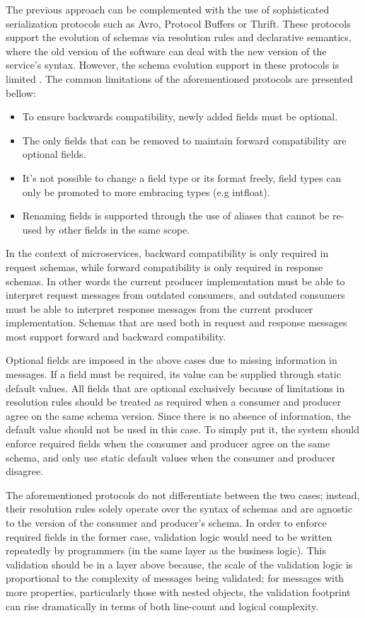 The previous approach can be complemented with the use of sophisticated serialization protocols such as Avro, Protocol Buffers or Thrift.
These protocols support the evolution of schemas via resolution rules and declarative semantics,
where the old version of the software can deal with the new version of the service’s syntax.
However, the schema evolution support in these protocols is limited \cite{11}.
The common limitations of the aforementioned protocols are presented bellow:
\begin{itemize}
    \item To ensure backwards compatibility, newly added fields must be optional.
    \item The only fields that can be removed to maintain forward compatibility are optional fields.
    \item It's not possible to change a field type or its format freely, field types can only be promoted to more embracing types (e.g int\textrightarrow float).
    \item Renaming fields is supported through the use of aliases that cannot be re-used by other fields in the same scope.
\end{itemize}

In the context of microservices, backward compatibility is only required in request schemas, while forward compatibility is only required in response schemas.
In other words the current producer implementation must be able to interpret request messages from outdated consumers, and outdated consumers
must be able to interpret response messages from the current producer implementation.
Schemas that are used both in request and response messages most support forward and backward compatibility.

Optional fields are imposed in the above cases due to missing information in messages.
If a field must be required, its value can be supplied through static default values.
All fields that are optional exclusively because of limitations in resolution rules should be treated as required when a consumer and producer agree on the same schema version.
Since there is no absence of information, the default value should not be used in this case.
To simply put it, the system should enforce required fields when the consumer and producer agree on the same schema, and only use static default values when the consumer and producer disagree.

The aforementioned protocols do not differentiate between the two cases; instead, their resolution rules solely operate over the syntax of schemas and are agnostic to the version of the consumer and producer's schema.
In order to enforce required fields in the former case,
validation logic would need to be written repeatedly by programmers (in the same layer as the business logic).
This validation should be in a layer above because, the scale of the validation logic is proportional to the complexity of messages being validated;
for messages with more properties, particularly those with nested objects, the validation footprint can rise dramatically in terms of both line-count and logical complexity.

